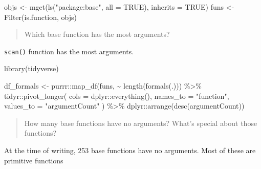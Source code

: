 \documentclass[
]{book}
\newenvironment{Shaded}{\begin{snugshade}}{\end{snugshade}}
\newcommand{\AttributeTok}[1]{\textcolor[rgb]{0.77,0.63,0.00}{#1}}
\newcommand{\ConstantTok}[1]{\textcolor[rgb]{0.00,0.00,0.00}{#1}}
\newcommand{\FunctionTok}[1]{\textcolor[rgb]{0.00,0.00,0.00}{#1}}
\newcommand{\NormalTok}[1]{#1}
\newcommand{\OtherTok}[1]{\textcolor[rgb]{0.56,0.35,0.01}{#1}}
\newcommand{\SpecialCharTok}[1]{\textcolor[rgb]{0.00,0.00,0.00}{#1}}
\newcommand{\StringTok}[1]{\textcolor[rgb]{0.31,0.60,0.02}{#1}}
\begin{document}
\begin{Shaded}
\begin{Highlighting}[]
\NormalTok{objs }\OtherTok{\textless{}{-}} \FunctionTok{mget}\NormalTok{(}\FunctionTok{ls}\NormalTok{(}\StringTok{"package:base"}\NormalTok{, }\AttributeTok{all =} \ConstantTok{TRUE}\NormalTok{), }\AttributeTok{inherits =} \ConstantTok{TRUE}\NormalTok{)}
\NormalTok{funs }\OtherTok{\textless{}{-}} \FunctionTok{Filter}\NormalTok{(is.function, objs)}
\end{Highlighting}
\end{Shaded}

\begin{quote}
Which base function has the most arguments?
\end{quote}

\texttt{scan()} function has the most arguments.

\begin{Shaded}
\begin{Highlighting}[]
\FunctionTok{library}\NormalTok{(tidyverse)}

\NormalTok{df\_formals }\OtherTok{\textless{}{-}}\NormalTok{ purrr}\SpecialCharTok{::}\FunctionTok{map\_df}\NormalTok{(funs, }\SpecialCharTok{\textasciitilde{}} \FunctionTok{length}\NormalTok{(}\FunctionTok{formals}\NormalTok{(.))) }\SpecialCharTok{\%\textgreater{}\%}
\NormalTok{  tidyr}\SpecialCharTok{::}\FunctionTok{pivot\_longer}\NormalTok{(}
    \AttributeTok{cols =}\NormalTok{ dplyr}\SpecialCharTok{::}\FunctionTok{everything}\NormalTok{(),}
    \AttributeTok{names\_to =} \StringTok{"function"}\NormalTok{,}
    \AttributeTok{values\_to =} \StringTok{"argumentCount"}
\NormalTok{  ) }\SpecialCharTok{\%\textgreater{}\%}
\NormalTok{  dplyr}\SpecialCharTok{::}\FunctionTok{arrange}\NormalTok{(}\FunctionTok{desc}\NormalTok{(argumentCount))}
\end{Highlighting}
\end{Shaded}

\begin{quote}
How many base functions have no arguments? What's special about those functions?
\end{quote}

At the time of writing, 253 base functions have no arguments. Most of these are primitive functions
\end{document}
